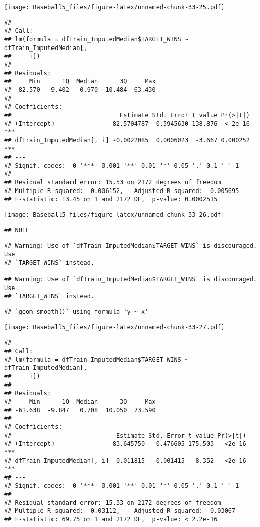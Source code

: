 \documentclass[
]{article}
\begin{document}
\texttt{[image: Baseball5\_files/figure-latex/unnamed-chunk-33-25.pdf]}

\begin{verbatim}
## 
## Call:
## lm(formula = dfTrain_ImputedMedian$TARGET_WINS ~ dfTrain_ImputedMedian[, 
##     i])
## 
## Residuals:
##     Min      1Q  Median      3Q     Max 
## -82.570  -9.402   0.970  10.484  63.430 
## 
## Coefficients:
##                              Estimate Std. Error t value Pr(>|t|)    
## (Intercept)                82.5704787  0.5945630 138.876  < 2e-16 ***
## dfTrain_ImputedMedian[, i] -0.0022085  0.0006023  -3.667 0.000252 ***
## ---
## Signif. codes:  0 '***' 0.001 '**' 0.01 '*' 0.05 '.' 0.1 ' ' 1
## 
## Residual standard error: 15.53 on 2172 degrees of freedom
## Multiple R-squared:  0.006152,   Adjusted R-squared:  0.005695 
## F-statistic: 13.45 on 1 and 2172 DF,  p-value: 0.0002515
\end{verbatim}

\texttt{[image: Baseball5\_files/figure-latex/unnamed-chunk-33-26.pdf]}

\begin{verbatim}
## NULL
\end{verbatim}

\begin{verbatim}
## Warning: Use of `dfTrain_ImputedMedian$TARGET_WINS` is discouraged. Use
## `TARGET_WINS` instead.

## Warning: Use of `dfTrain_ImputedMedian$TARGET_WINS` is discouraged. Use
## `TARGET_WINS` instead.
\end{verbatim}

\begin{verbatim}
## `geom_smooth()` using formula 'y ~ x'
\end{verbatim}

\texttt{[image: Baseball5\_files/figure-latex/unnamed-chunk-33-27.pdf]}

\begin{verbatim}
## 
## Call:
## lm(formula = dfTrain_ImputedMedian$TARGET_WINS ~ dfTrain_ImputedMedian[, 
##     i])
## 
## Residuals:
##     Min      1Q  Median      3Q     Max 
## -61.638  -9.847   0.708  10.050  73.590 
## 
## Coefficients:
##                             Estimate Std. Error t value Pr(>|t|)    
## (Intercept)                83.645750   0.476605 175.503   <2e-16 ***
## dfTrain_ImputedMedian[, i] -0.011815   0.001415  -8.352   <2e-16 ***
## ---
## Signif. codes:  0 '***' 0.001 '**' 0.01 '*' 0.05 '.' 0.1 ' ' 1
## 
## Residual standard error: 15.33 on 2172 degrees of freedom
## Multiple R-squared:  0.03112,    Adjusted R-squared:  0.03067 
## F-statistic: 69.75 on 1 and 2172 DF,  p-value: < 2.2e-16
\end{verbatim}
\end{document}

